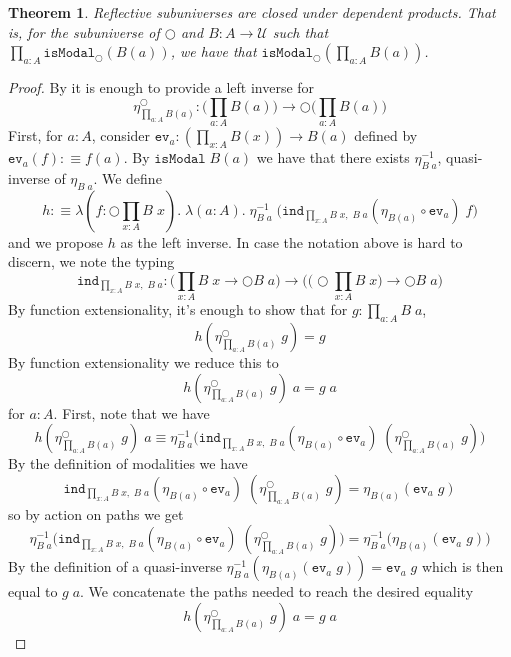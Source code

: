 \documentclass[12pt]{report}
\newtheorem{thm}{Theorem}[chapter]
\theoremstyle{definition}
\begin{document}
\begin{thm}\label{reflSubuniversePiTypes}
Reflective subuniverses are closed under dependent products.
That is, for the subuniverse of $\bigcirc$ and $B : A \rightarrow \mathcal{U}$ such that\\
$\prod_{a : A}\mathtt{isModal}_{\bigcirc}(B(a))$, we have that $\mathtt{isModal}_{\bigcirc}(\prod_{a : A} B(a))$. 
\end{thm}

\begin{proof}
By  it is enough to provide a left inverse for 
$$\eta^\bigcirc_{\prod_{a : A} B(a)} : \Big(\prod_{a : A} B(a)\Big) \rightarrow \bigcirc \Big( \prod_{a : A} B(a) \Big)$$
First, for $a : A$, consider $\mathtt{ev}_a: (\prod_{x: A}B(x)) \rightarrow B(a)$ defined by $\mathtt{ev}_a (f) : \equiv f(a)$. 
By $\mathtt{isModal}\; B(a)$ we have that there exists $\eta_{B\;a}^{-1}$, quasi-inverse of $\eta_{B\;a}$. 
We define 
$$h :\equiv \lambda(f : \bigcirc \prod_{x : A}B\;x).\;\lambda(a : A).\; \eta_{B\;a}^{-1}\;\big(\mathtt{ind}_{\prod_{x :A}B\;x,\;B\;a}(\eta_{B(a)} \circ \mathtt{ev}_a)\;f\big)$$
and we propose $h$ as the left inverse. 
In case the notation above is hard to discern, we note the typing
$$\mathtt{ind}_{\prod_{x :A}B\;x,\;B\;a} : \Big( \prod_{x : A} B\;x \rightarrow \bigcirc B\;a \Big) \rightarrow \Big( \big(\bigcirc \prod_{x : A} B\;x\big) \rightarrow \bigcirc B\;a \Big)$$
By function extensionality, it's enough to show that for $g : \prod_{a:A}B\;a$, 
$$h(\eta^\bigcirc_{\prod_{a : A} B(a)}\; g) = g$$
By function extensionality we reduce this to
$$h(\eta^\bigcirc_{\prod_{a : A} B(a)}\; g)\;a = g\;a$$
for $a :A$. 
First, note that we have 
$$h(\eta^\bigcirc_{\prod_{a : A} B(a)}\; g)\;a \equiv \eta_{B\;a}^{-1}\big(\mathtt{ind}_{\prod_{x :A}B\;x,\;B\;a}(\eta_{B(a)} \circ \mathtt{ev}_a)\; (\eta^\bigcirc_{\prod_{a : A} B(a)}\; g)\big)$$
By the definition of modalities we have
$$\mathtt{ind}_{\prod_{x :A}B\;x,\;B\;a}(\eta_{B(a)} \circ \mathtt{ev}_a)\; (\eta^\bigcirc_{\prod_{a : A} B(a)}\; g) = \eta_{B(a)}(\mathtt{ev}_a\; g)$$
so by action on paths we get
$$\eta_{B\;a}^{-1}\big(\mathtt{ind}_{\prod_{x :A}B\;x,\;B\;a}(\eta_{B(a)} \circ \mathtt{ev}_a)\; (\eta^\bigcirc_{\prod_{a : A} B(a)}\; g)\big) = \eta_{B\;a}^{-1}\big( \eta_{B(a)}(\mathtt{ev}_a\; g) \big)$$
By the definition of a quasi-inverse $\eta_{B\;a}^{-1}( \eta_{B(a)}(\mathtt{ev}_a\; g) ) = \mathtt{ev}_a\;g$ which is then equal to $g\;a$. 
We concatenate the paths needed to reach the desired equality
$$h(\eta^\bigcirc_{\prod_{a : A} B(a)}\; g)\;a = g\;a$$

\end{proof}
\end{document}
